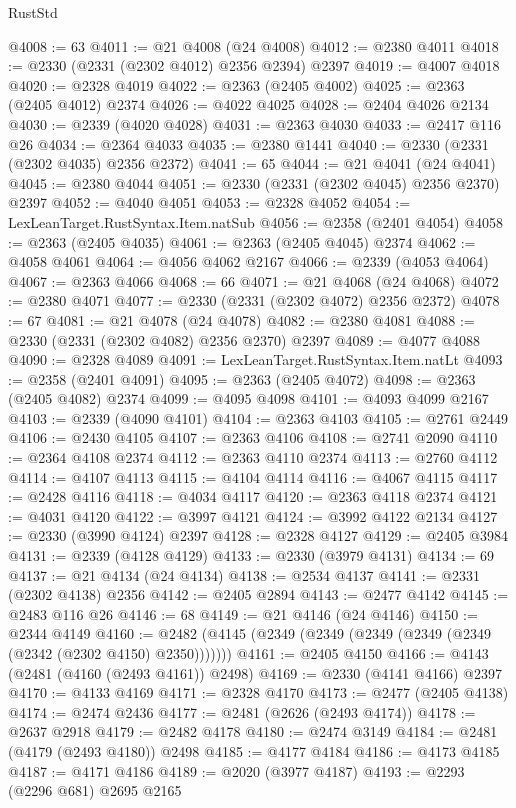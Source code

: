\begin{lexlean}{RustStd}
\begin{coremodule}
@4008 := 63
@4011 := @21 @4008 (@24 @4008)
@4012 := @2380 @4011
@4018 := @2330 (@2331 (@2302 @4012) @2356 @2394) @2397
@4019 := @4007 @4018
@4020 := @2328 @4019
@4022 := @2363 (@2405 @4002)
@4025 := @2363 (@2405 @4012) @2374
@4026 := @4022 @4025
@4028 := @2404 @4026 @2134
@4030 := @2339 (@4020 @4028)
@4031 := @2363 @4030
@4033 := @2417 @116 @26
@4034 := @2364 @4033
@4035 := @2380 @1441
@4040 := @2330 (@2331 (@2302 @4035) @2356 @2372)
@4041 := 65
@4044 := @21 @4041 (@24 @4041)
@4045 := @2380 @4044
@4051 := @2330 (@2331 (@2302 @4045) @2356 @2370) @2397
@4052 := @4040 @4051
@4053 := @2328 @4052
@4054 := LexLeanTarget.RustSyntax.Item.natSub
@4056 := @2358 (@2401 @4054)
@4058 := @2363 (@2405 @4035)
@4061 := @2363 (@2405 @4045) @2374
@4062 := @4058 @4061
@4064 := @4056 @4062 @2167
@4066 := @2339 (@4053 @4064)
@4067 := @2363 @4066
@4068 := 66
@4071 := @21 @4068 (@24 @4068)
@4072 := @2380 @4071
@4077 := @2330 (@2331 (@2302 @4072) @2356 @2372)
@4078 := 67
@4081 := @21 @4078 (@24 @4078)
@4082 := @2380 @4081
@4088 := @2330 (@2331 (@2302 @4082) @2356 @2370) @2397
@4089 := @4077 @4088
@4090 := @2328 @4089
@4091 := LexLeanTarget.RustSyntax.Item.natLt
@4093 := @2358 (@2401 @4091)
@4095 := @2363 (@2405 @4072)
@4098 := @2363 (@2405 @4082) @2374
@4099 := @4095 @4098
@4101 := @4093 @4099 @2167
@4103 := @2339 (@4090 @4101)
@4104 := @2363 @4103
@4105 := @2761 @2449
@4106 := @2430 @4105
@4107 := @2363 @4106
@4108 := @2741 @2090
@4110 := @2364 @4108 @2374
@4112 := @2363 @4110 @2374
@4113 := @2760 @4112
@4114 := @4107 @4113
@4115 := @4104 @4114
@4116 := @4067 @4115
@4117 := @2428 @4116
@4118 := @4034 @4117
@4120 := @2363 @4118 @2374
@4121 := @4031 @4120
@4122 := @3997 @4121
@4124 := @3992 @4122 @2134
@4127 := @2330 (@3990 @4124) @2397
@4128 := @2328 @4127
@4129 := @2405 @3984
@4131 := @2339 (@4128 @4129)
@4133 := @2330 (@3979 @4131)
@4134 := 69
@4137 := @21 @4134 (@24 @4134)
@4138 := @2534 @4137
@4141 := @2331 (@2302 @4138) @2356
@4142 := @2405 @2894
@4143 := @2477 @4142
@4145 := @2483 @116 @26
@4146 := 68
@4149 := @21 @4146 (@24 @4146)
@4150 := @2344 @4149
@4160 := @2482 (@4145 (@2349 (@2349 (@2349 (@2349 (@2349 (@2342 (@2302 @4150) @2350)))))))
@4161 := @2405 @4150
@4166 := @4143 (@2481 (@4160 (@2493 @4161)) @2498)
@4169 := @2330 (@4141 @4166) @2397
@4170 := @4133 @4169
@4171 := @2328 @4170
@4173 := @2477 (@2405 @4138)
@4174 := @2474 @2436
@4177 := @2481 (@2626 (@2493 @4174))
@4178 := @2637 @2918
@4179 := @2482 @4178
@4180 := @2474 @3149
@4184 := @2481 (@4179 (@2493 @4180)) @2498
@4185 := @4177 @4184
@4186 := @4173 @4185
@4187 := @4171 @4186
@4189 := @2020 (@3977 @4187)
@4193 := @2293 (@2296 @681) @2695 @2165

\end{coremodule}
\end{lexlean}
